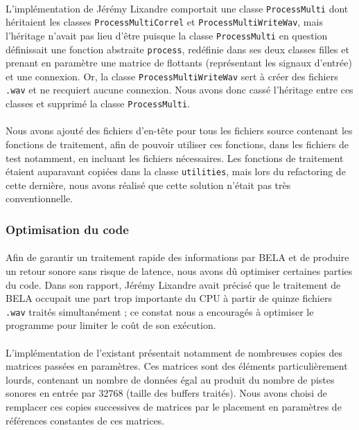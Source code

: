 \paragraph{}
L'implémentation de Jérémy Lixandre comportait une classe
\verb!ProcessMulti! dont héritaient les classes
\verb!ProcessMultiCorrel! et \verb!ProcessMultiWriteWav!, mais
l'héritage n'avait pas lieu d'être puisque la classe
\verb!ProcessMulti! en question définissait une fonction abstraite
\verb!process!, redéfinie dans ses deux classes filles et prenant en
paramètre une matrice de flottants (représentant les signaux d'entrée)
et une connexion. Or, la classe \verb!ProcessMultiWriteWav! sert à
créer des fichiers \verb!.wav! et ne recquiert aucune connexion. Nous
avons donc cassé l'héritage entre ces classes et supprimé la classe
\verb!ProcessMulti!.

\paragraph{}
Nous avons ajouté des fichiers d'en-tête pour tous les fichiers source
contenant les fonctions de traitement, afin de pouvoir utiliser ces
fonctions, dans les fichiers de test notamment, en incluant les fichiers
nécessaires. Les fonctions de traitement étaient auparavant copiées
dans la classe \verb!utilities!, mais lors du refactoring de cette
dernière, nous avons réalisé que cette solution n'était pas très
conventionnelle.


\subsubsection{Optimisation du code}
\paragraph{}
Afin de garantir un traitement rapide des informations par BELA et de
produire un retour sonore sans risque de latence, nous avons dû
optimiser certaines parties du code. Dans son rapport, Jérémy Lixandre
avait précisé que le traitement de BELA occupait une part trop
importante du CPU à partir de quinze fichiers \verb!.wav! traités
simultanément ; ce constat nous a encouragés à optimiser le programme
pour limiter le coût de son exécution.
\paragraph{}
L'implémentation de l'existant présentait notamment de nombreuses
copies des matrices passées en paramètres. Ces matrices sont des
éléments particulièrement lourds, contenant un nombre de données égal
au produit du nombre de pistes sonores en entrée par 32768 (taille des
buffers traités). Nous avons choisi de remplacer ces copies
successives de matrices par le placement en paramètres de références
constantes de ces matrices.

